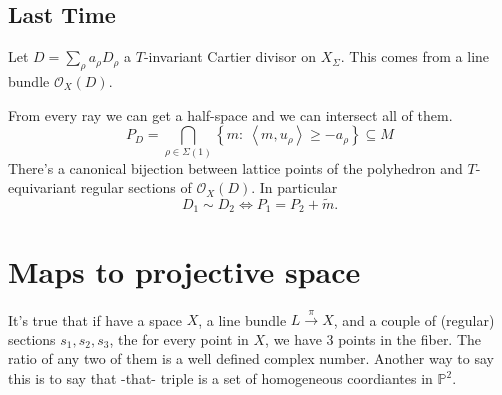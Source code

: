 \documentclass[11pt]{article}
\theoremstyle{definition}
\newcommand{\Sg}{\Sigma}
\newcommand{\cO}{\mathcal{O}}
\newcommand{\set}[1]{\left\{#1\right\}}
\newcommand{\braket}[2]{\left\langle #1,#2\right\rangle}
\newcommand{\bP}{\mathbb{P}}
\begin{document}
\subsection{Last Time}

Let \(D=\sum_\rho a_\rho D_\rho\) a \(T\)-invariant Cartier divisor on \(X_\Sg\). This comes from a line bundle \(\cO_X(D)\).

From every ray we can get a half-space and we can intersect all of them.
\[
    P_D=\bigcap_{\rho\in\Sg(1)}\set{m:\ \braket{m}{u_\rho}\geq -a_\rho}\subseteq M
\]
There's a canonical bijection between lattice points of the polyhedron and \(T\)-equivariant regular sections of \(\cO_X(D)\). In particular
\[
    D_1\sim D_2 \iff P_1=P_2+\widetilde{m}.
\]

\section{Maps to projective space}

It's true that if have a space \(X\), a line bundle \(L\xrightarrow{\pi}X\), and a couple of (regular) sections \(s_1,s_2,s_3\), the for every point in \(X\), we have 3 points in the fiber. The ratio of any two of them is a well defined complex number. Another way to say this is to say that -that- triple is a set of homogeneous coordiantes in \(\bP^2\). 
\end{document}
